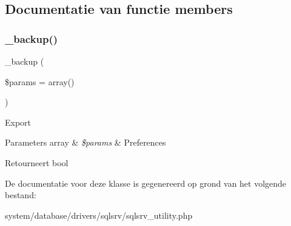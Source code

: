 \subsection{Documentatie van functie members}
\mbox{\label{class_c_i___d_b__sqlsrv__utility_a30f3053d2c82e7562349924363507afa}} 
\subsubsection{\texorpdfstring{\_backup()}{\_backup()}}
{\footnotesize\ttfamily \+\_\+backup (\begin{DoxyParamCaption}\item[{}]{\$params = {\ttfamily array()} }\end{DoxyParamCaption})\hspace{0.3cm}{\ttfamily [protected]}}

Export


\begin{DoxyParams}[1]{Parameters}
array & {\em \$params} & Preferences \\
\hline
\end{DoxyParams}
\begin{DoxyReturn}{Retourneert}
bool 
\end{DoxyReturn}


De documentatie voor deze klasse is gegenereerd op grond van het volgende bestand\+:\begin{DoxyCompactItemize}
\item 
system/database/drivers/sqlsrv/sqlsrv\+\_\+utility.\+php\end{DoxyCompactItemize}
